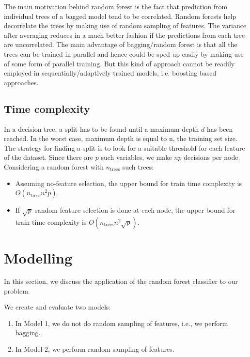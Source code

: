 \documentclass[conference]{IEEEtran}
\begin{document}
The main motivation behind random forest is the fact that prediction from individual trees of a bagged model tend to be correlated. Random forests help decorrelate the trees by making use of random sampling of features. The variance after averaging reduces in a much better fashion if the predictions from each tree are uncorrelated. The main advantage of bagging/random forest is that all the trees can
be trained in parallel and hence could be sped up easily by making use of some form of parallel training. But this kind of approach cannot be readily employed in sequentially/adaptively trained models, i.e. boosting based approaches.

\subsection{Time complexity}

In a decision tree, a split has to be found until a maximum depth $d$ has been reached. In the worst case, maximum depth is equal to n, the training set size. The strategy for finding a split is to look for a suitable threshold for each feature of the dataset. Since there are $p$ such variables, we make $np$ decisions per node. Considering a random forest with $n_\textrm{trees}$ such trees:
\begin{itemize}
    \item Assuming no-feature selection, the upper bound for train time complexity is $O(n_\textrm{trees} n^2 p)$.
    \item  If $\sqrt{p}$ random feature selection is done at each node, the upper bound for train time complexity is $O(n_\textrm{trees} n^2 \sqrt{p})$.
\end{itemize}




\section{Modelling }

In this section, we discuss the application of the random forest classifier to our problem. 

We create and evaluate two models:

\begin{enumerate}
    \item In Model 1, we do not do random sampling of features, i.e., we perform bagging.
    \item In Model 2, we perform random sampling of features.
\end{enumerate}
\end{document}

